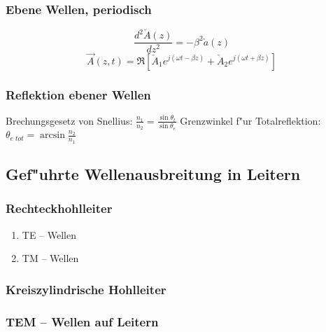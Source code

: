 \subsubsection{Ebene Wellen, periodisch}
$$\frac{d^2\check{A}(z)}{dz^2}=-\beta^2 \check{a}(z)$$
$$\vec{A}(z,t)=\Re\left[\check{A}_1e^{j(\omega t-\beta
z)}+\check{A}_2e^{j(\omega t+\beta z)}\right]$$

\subsubsection{Reflektion ebener Wellen}
Brechungsgesetz von Snellius: $\frac{n_1}{n_2}=\frac{\sin\theta_t}{\sin\theta_e}$
Grenzwinkel f"ur Totalreflektion: $\theta_{e\; tot}=\arcsin\frac{n_2}{n_1}$


\clearpage \subsection{Gef"uhrte Wellenausbreitung in Leitern}
\subsubsection{Rechteckhohlleiter}
\begin{enumerate}
\item TE -- Wellen
\item TM -- Wellen
\end{enumerate}
\subsubsection{Kreiszylindrische Hohlleiter}

\subsubsection{TEM -- Wellen auf Leitern}
